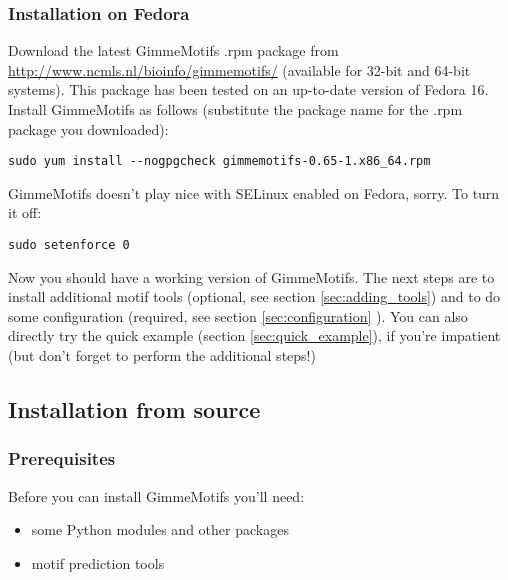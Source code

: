 \documentclass[11pt]{article}
\begin{document}
\subsubsection{Installation on Fedora}
Download the latest GimmeMotifs .rpm package from \url{http://www.ncmls.nl/bioinfo/gimmemotifs/} (available for 32-bit and 64-bit systems). This package has been tested on an up-to-date version of Fedora 16. Install GimmeMotifs as follows (substitute the package name for the .rpm package you downloaded):
\begin{verbatim}
sudo yum install --nogpgcheck gimmemotifs-0.65-1.x86_64.rpm 
\end{verbatim}
GimmeMotifs doesn't play nice with SELinux enabled on Fedora, sorry. To turn it off:
\begin{verbatim}
sudo setenforce 0
\end{verbatim}
Now you should have a working version of GimmeMotifs. The next steps are to install additional motif tools (optional, see section \ref{sec:adding_tools}) and to do some configuration (required, see section \ref{sec:configuration} ). You can also directly try the quick example (section \ref{sec:quick_example}), if you're impatient (but don't forget to perform the additional steps!)

\subsection{Installation from source}

\subsubsection{Prerequisites}
Before you can install GimmeMotifs you'll need: 
\begin{itemize}
 \item some Python modules and other packages 
 \item motif prediction tools
\end{itemize}
\end{document}
